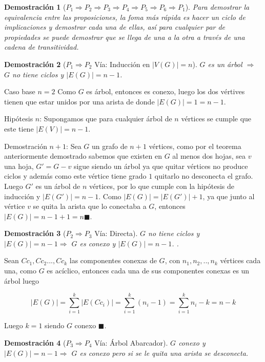 \documentclass[a4paper,1pt]{report}
\newtheorem*{dem}{Demostración}
\begin{document}
\begin{dem}[$P_1 \Rightarrow P_2 \Rightarrow P_3 \Rightarrow P_4 \Rightarrow P_5 \Rightarrow P_6 \Rightarrow P_1$]
    Para demostrar la equivalencia entre las proposiciones, la foma m\'as r\'apida es hacer un ciclo de implicaciones y demostrar cada una de ellas, as\'i para cualquier par de propiedades se puede demostrar que se llega de una a la otra a trav\'es de una cadena de transitividad.
\end{dem}
\begin{dem}[$P_1 \Rightarrow P_2$ V\'ia: Inducci\'on en $|V(G)| = n$] $G$ es un \'arbol $\Rightarrow$ $G$ no tiene ciclos y $|E(G)| = n-1$.\end{dem}

Caso base $n = 2$ Como $G$ es \'arbol, entonces es conexo, luego los dos v\'ertives tienen que estar unidos por una arista de donde $|E(G)| = 1 = n-1$.

Hip\'otesis $n$: Supongamos que para cualquier \'arbol de $n$ v\'ertices se cumple que este tiene $|E(V)| = n -1$.

Demostración $n+1$: Sea $G$ un grafo de $n+1$ v\'ertices, como por el teorema anteriormente demostrado sabemos que existen en $G$ al menos dos hojas, sea $v$ una hoja, $G' = G - v$ sigue siendo un \'arbol ya que quitar v\'ertices no produce ciclos y adem\'as como este v\'ertice tiene grado $1$ quitarlo no desconecta el grafo. Luego $G'$ es un \'arbol de $n$ v\'ertices, por lo que cumple con la hip\'otesis de inducci\'on y $|E(G')| = n-1$. Como $|E(G)| = |E(G')| +1$, ya que junto al v\'ertice $v$ se quita la arista que lo conectaba a $G$, entonces $|E(G)| = n-1+1 = n \blacksquare$.

\begin{dem}[$P_2 \Rightarrow P_3$ V\'ia: Directa] $G$ no tiene ciclos y $|E(G)| = n-1 \Rightarrow$ $G$ es conexo y $|E(G)| = n-1$. .\end{dem}

Sean $Cc_1, Cc_2..., Cc_k$ las componentes conexas de $G$, con $n_1, n_2,.., n_k$ v\'ertices cada una,  como $G$ es ac\'iclico, entonces cada una de sus componentes conexas es un \'arbol luego 

$$ |E(G)| = \sum_{i = 1}^{k} |E(Cc_i)| = \sum_{i =1}^{k} (n_i -1) = \sum_{i =1}^{k} n_i -k = n -k$$

Luego $k = 1$ siendo $G$ conexo $\blacksquare$.

\begin{dem}[$P_3 \Rightarrow P_4$ V\'ia: \'Arbol Abarcador] $G$ conexo y $|E(G)| = n-1 \Rightarrow$ $G$ es conexo pero si se le quita una arista se desconecta.\end{dem}
\end{document}
